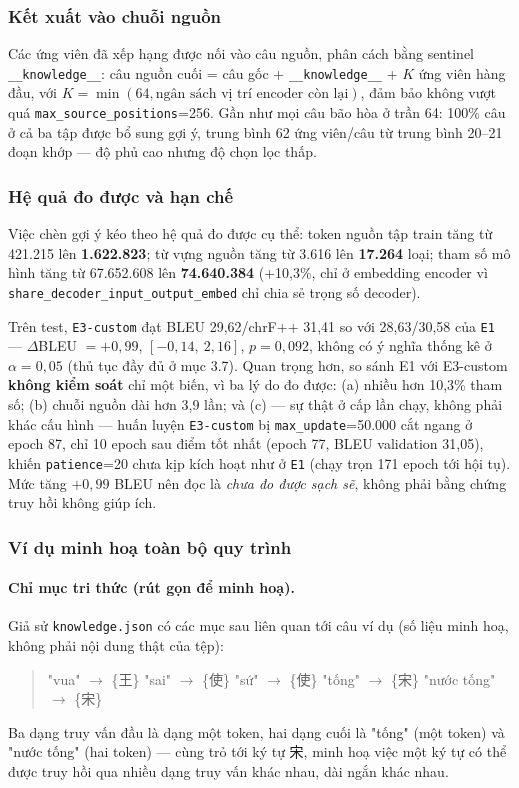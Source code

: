 \subsubsection{Kết xuất vào chuỗi nguồn}

Các ứng viên đã xếp hạng được nối vào câu nguồn, phân cách bằng sentinel
\texttt{\_\_knowledge\_\_}: câu nguồn cuối = câu gốc + \texttt{\_\_knowledge\_\_} + $K$
ứng viên hàng đầu, với $K = \min(64, \text{ngân sách vị trí encoder còn lại})$, đảm bảo
không vượt quá \texttt{max\_source\_positions}=256. Gần như mọi câu bão hòa ở trần 64:
100\% câu ở cả ba tập được bổ sung gợi ý, trung bình 62 ứng viên/câu từ trung bình
20--21 đoạn khớp — độ phủ cao nhưng độ chọn lọc thấp.

\subsubsection{Hệ quả đo được và hạn chế}

Việc chèn gợi ý kéo theo hệ quả đo được cụ thể: token nguồn tập train tăng từ 421.215
lên \textbf{1.622.823}; từ vựng nguồn tăng từ 3.616 lên \textbf{17.264} loại; tham số mô
hình tăng từ 67.652.608 lên \textbf{74.640.384} (+10,3\%, chỉ ở embedding encoder vì
\texttt{share\_decoder\_input\_output\_embed} chỉ chia sẻ trọng số decoder).

Trên test, \texttt{E3-custom} đạt BLEU 29,62/chrF++ 31,41 so với 28,63/30,58 của
\texttt{E1} — $\Delta$BLEU $=+0{,}99$, $[-0{,}14,\ 2{,}16]$, $p=0{,}092$, không có ý
nghĩa thống kê ở $\alpha=0{,}05$ (thủ tục đầy đủ ở mục 3.7). Quan trọng hơn, so sánh E1
với E3-custom \textbf{không kiểm soát} chỉ một biến, vì ba lý do đo được: (a) nhiều hơn
10,3\% tham số; (b) chuỗi nguồn dài hơn 3,9 lần; và (c) — sự thật ở cấp lần chạy, không
phải khác cấu hình — huấn luyện \texttt{E3-custom} bị \texttt{max\_update}=50.000 cắt
ngang ở epoch 87, chỉ 10 epoch sau điểm tốt nhất (epoch 77, BLEU validation 31,05),
khiến \texttt{patience}=20 chưa kịp kích hoạt như ở \texttt{E1} (chạy trọn 171 epoch tới
hội tụ). Mức tăng $+0{,}99$ BLEU nên đọc là \textit{chưa đo được sạch sẽ}, không phải
bằng chứng truy hồi không giúp ích.

\subsubsection{Ví dụ minh hoạ toàn bộ quy trình}

\paragraph{Chỉ mục tri thức (rút gọn để minh hoạ).} Giả sử \texttt{knowledge.json} có
các mục sau liên quan tới câu ví dụ (số liệu minh hoạ, không phải nội dung thật của
tệp):
\begin{quote}\small
"vua" $\to$ \{王\} \quad\quad
"sai" $\to$ \{使\} \quad\quad
"sứ" $\to$ \{使\} \quad\quad
"tống" $\to$ \{宋\} \quad\quad
"nước tống" $\to$ \{宋\}
\end{quote}
Ba dạng truy vấn đầu là dạng một token, hai dạng cuối là "tống" (một token) và "nước
tống" (hai token) — cùng trỏ tới ký tự 宋, minh hoạ việc một ký tự có thể được truy hồi
qua nhiều dạng truy vấn khác nhau, dài ngắn khác nhau.

